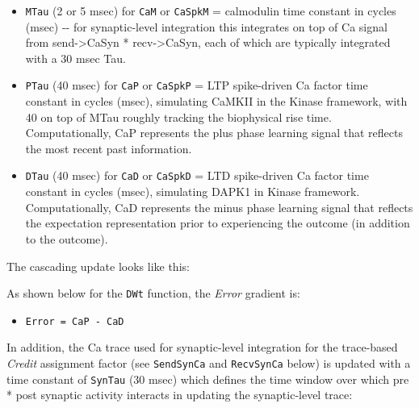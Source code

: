 \documentclass[11pt,twoside]{article}
\newif\myifpdf
\begin{document}
\begin{itemize}
\item
  \texttt{MTau} (2 or 5 msec) for \texttt{CaM} or \texttt{CaSpkM} =
  calmodulin time constant in cycles (msec) -\/- for synaptic-level
  integration this integrates on top of Ca signal from
  send-\textgreater CaSyn * recv-\textgreater CaSyn, each of which are
  typically integrated with a 30 msec Tau.
\item
  \texttt{PTau} (40 msec) for \texttt{CaP} or \texttt{CaSpkP} = LTP
  spike-driven Ca factor time constant in cycles (msec), simulating
  CaMKII in the Kinase framework, with 40 on top of MTau roughly
  tracking the biophysical rise time. Computationally, CaP represents
  the plus phase learning signal that reflects the most recent past
  information.
\item
  \texttt{DTau} (40 msec) for \texttt{CaD} or \texttt{CaSpkD} = LTD
  spike-driven Ca factor time constant in cycles (msec), simulating
  DAPK1 in Kinase framework. Computationally, CaD represents the minus
  phase learning signal that reflects the expectation representation
  prior to experiencing the outcome (in addition to the outcome).
\end{itemize}

The cascading update looks like this:

\begin{Shaded}
\begin{Highlighting}[]
\OperatorTok{+=} \OperatorTok{(}\OperatorTok{{-}}\OperatorTok{)} \OperatorTok{/}
\OperatorTok{+=} \OperatorTok{(}\OperatorTok{{-}}\OperatorTok{)} \OperatorTok{/}
\OperatorTok{+=} \OperatorTok{(}\OperatorTok{{-}}\OperatorTok{)} \OperatorTok{/}
\end{Highlighting}
\end{Shaded}

As shown below for the \texttt{DWt} function, the \emph{Error} gradient
is:

\begin{itemize}
\tightlist
\item
  \texttt{Error\ =\ CaP\ -\ CaD}
\end{itemize}

In addition, the Ca trace used for synaptic-level integration for the
trace-based \emph{Credit} assignment factor (see \texttt{SendSynCa} and
\texttt{RecvSynCa} below) is updated with a time constant of
\texttt{SynTau} (30 msec) which defines the time window over which pre *
post synaptic activity interacts in updating the synaptic-level trace:
\end{document}
